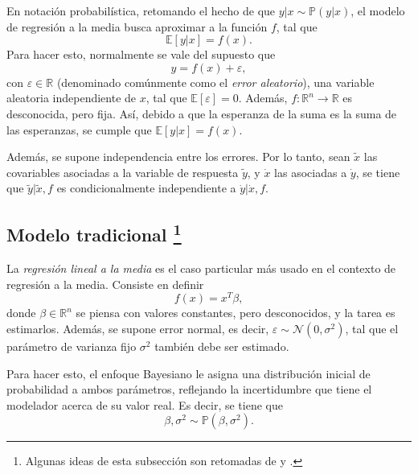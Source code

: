 En notaci\'on probabil\'istica, retomando el hecho de que $y|x \sim \mathbb{P}(y|x)$, el modelo de regresi\'on a la media busca aproximar a la funci\'on $f$, tal que 
\begin{equation*}
    \mathbb{E}[y|x] = f(x).
\end{equation*}
Para hacer esto, normalmente se vale del supuesto que
\begin{equation*}
    y = f(x) + \varepsilon,
\end{equation*}
con $\varepsilon \in \mathbb{R}$ (denominado com\'unmente como el \textit{error aleatorio}), una variable aleatoria independiente de $x$, tal que $\mathbb{E}[\varepsilon] = 0$. Adem\'as, $f: \mathbb{R}^n \rightarrow \mathbb{R}$ es desconocida, pero fija. As\'i, debido a que la esperanza de la suma es la suma de las esperanzas, se cumple que $\mathbb{E}[y|x] = f(x)$.

Adem\'as, se supone independencia entre los errores. Por lo tanto, sean $\tilde{x}$ las covariables asociadas a la variable de respuesta $\tilde{y}$, y $\dot{x}$ las asociadas a $\dot{y}$, se tiene que $\tilde{y} | \tilde{x}, f$ es condicionalmente independiente a $\dot{y} | \dot{x}, f$.

\subsection[Modelo tradicional]{
    Modelo tradicional
    \footnote{Algunas ideas de esta subsecci\'on son retomadas de \cite{Denison_BayesMethods} y \cite{Bannerjee_BayLinMod}.}
}

La \textit{regresi\'on lineal a la media} es el caso particular m\'as usado en el contexto de regresi\'on a la media. Consiste en definir
\begin{equation*}
    f(x) = x^T\beta,
\end{equation*}
donde $\beta \in \mathbb{R}^n$ se piensa con valores constantes, pero desconocidos, y la tarea es estimarlos. Adem\'as, se supone error normal, es decir, $\varepsilon \sim \mathcal{N}(0,\sigma^2)$, tal que el par\'ametro de varianza fijo $\sigma^2$ tambi\'en debe ser estimado.

Para hacer esto, el enfoque Bayesiano le asigna una distribución inicial de probabilidad a ambos par\'ametros, reflejando la incertidumbre que tiene el modelador acerca de su valor real. Es decir, se tiene que 
\begin{equation*}
    \beta,\sigma^2 \sim \mathbb{P}(\beta,\sigma^2).
\end{equation*}

